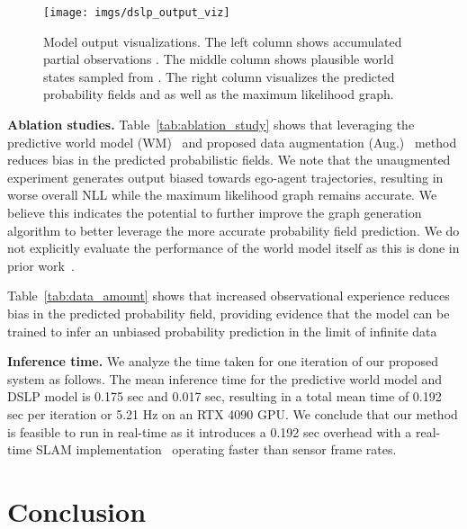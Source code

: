 \documentclass[letterpaper, 10 pt, conference]{ieeeconf}
\begin{document}
\begin{figure} \centering
\texttt{[image: imgs/dslp\_output\_viz]}
\vspace{-8mm}
\caption{Model output visualizations. The left column shows accumulated partial observations . The middle column shows plausible world states  sampled from . The right column visualizes the predicted probability fields  and  as well as the maximum likelihood graph.}
\label{fig:output_viz}
\vspace{-6mm}
\end{figure}

\textbf{Ablation studies.}
Table~\ref{tab:ablation_study} shows that leveraging the predictive world model (WM)~\cite{karlsson2023pred_wm} and 
proposed data augmentation (Aug.)~\cite{karlsson2020dsla} method reduces bias in the predicted probabilistic fields. We note that the unaugmented experiment generates output biased towards ego-agent trajectories, resulting in worse overall NLL while the maximum likelihood graph remains accurate. We believe this indicates the potential to further improve the graph generation algorithm to better leverage the more accurate probability field prediction. We do not explicitly evaluate the performance of the world model itself as this is done in prior work~\cite{karlsson2023pred_wm}.

Table~\ref{tab:data_amount} shows that increased observational experience reduces bias in the predicted probability field, providing evidence that the model can be trained to infer an unbiased probability prediction in the limit of infinite data




\textbf{Inference time.} We analyze the time taken for one iteration of our proposed system as follows. The mean inference time for the predictive world model and DSLP model is 0.175 sec and 0.017 sec, resulting in a total mean time of 0.192 sec per iteration or 5.21 Hz on an RTX 4090 GPU. We conclude that our method is feasible to run in real-time as it introduces a 0.192 sec overhead with a real-time SLAM implementation~\cite{vizzo2022kiss-icp} operating faster than sensor frame rates.


\section{Conclusion}
\end{document}
